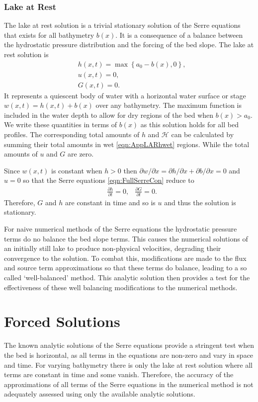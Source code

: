 \subsubsection{Lake at Rest}
The lake at rest solution is a trivial stationary solution of the Serre equations that exists for all bathymetry $b(x)$. It is a consequence of a balance between the hydrostatic pressure distribution and the forcing of the bed slope. The lake at rest solution is
\begin{subequations}
	\begin{align}
	&h(x,t) = \max\left\lbrace a_0 - b(x), 0 \right\rbrace, \\
	&u(x,t) = 0 , \\
	&G(x,t) = 0 .
	\end{align}
	\label{eqn:LARdefhub}
\end{subequations}
It represents a quiescent body of water with a horizontal water surface or stage $w(x,t) = h(x,t) + b(x)$ over any bathymetry. The maximum function is included in the water depth to allow for dry regions of the bed when $b(x) > a_0$. We write these quantities in terms of $b(x)$ as this solution holds for all bed profiles. The corresponding total amounts of $h$ and $\mathcal{H}$ can be calculated by summing their total amounts in wet \eqref{eqn:AppLARhwet} regions. While the total amounts of $u$ and $G$ are zero. 

Since $w(x,t)$ is constant when $h> 0$ then $\partial w / \partial x = \partial h / \partial x + \partial b / \partial x = 0 $ and $u=0$ so that the Serre equations \eqref{eqn:FullSerreCon} reduce to
\begin{align*}
& \frac{\partial h}{\partial t}  = 0,  &\frac{\partial G}{\partial t}  = 0.
\end{align*}
Therefore, $G$ and $h$ are constant in time and so is $u$ and thus the solution is stationary.

For naive numerical methods of the Serre equations the hydrostatic pressure terms do no balance the bed slope terms. This causes the numerical solutions of an initially still lake to produce non-physical velocities, degrading their convergence to the solution. To combat this, modifications are made to the flux and source term approximations so that these terms do balance, leading to a so called `well-balanced' method. This analytic solution then provides a test for the effectiveness of these well balancing modifications to the numerical methods.


\section{Forced Solutions}
The known analytic solutions of the Serre equations provide a stringent test when the bed is horizontal, as all terms in the equations are non-zero and vary in space and time. For varying bathymetry there is only the lake at rest solution where all terms are constant in time and some vanish. Therefore, the accuracy of the approximations of all terms of the Serre equations in the numerical method is not adequately assessed using only the available analytic solutions.

